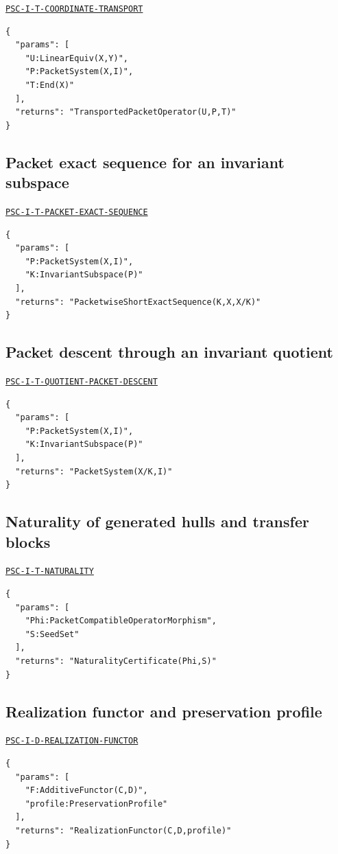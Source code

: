 \documentclass[a4paper,11pt]{article}
\begin{document}
\hyperref[rec:PSC-I-T-COORDINATE-TRANSPORT]{\nolinkurl{PSC-I-T-COORDINATE-TRANSPORT}}
\begin{lstlisting}
{
  "params": [
    "U:LinearEquiv(X,Y)",
    "P:PacketSystem(X,I)",
    "T:End(X)"
  ],
  "returns": "TransportedPacketOperator(U,P,T)"
}
\end{lstlisting}
\subsection*{Packet exact sequence for an invariant subspace}
\hyperref[rec:PSC-I-T-PACKET-EXACT-SEQUENCE]{\nolinkurl{PSC-I-T-PACKET-EXACT-SEQUENCE}}
\begin{lstlisting}
{
  "params": [
    "P:PacketSystem(X,I)",
    "K:InvariantSubspace(P)"
  ],
  "returns": "PacketwiseShortExactSequence(K,X,X/K)"
}
\end{lstlisting}
\subsection*{Packet descent through an invariant quotient}
\hyperref[rec:PSC-I-T-QUOTIENT-PACKET-DESCENT]{\nolinkurl{PSC-I-T-QUOTIENT-PACKET-DESCENT}}
\begin{lstlisting}
{
  "params": [
    "P:PacketSystem(X,I)",
    "K:InvariantSubspace(P)"
  ],
  "returns": "PacketSystem(X/K,I)"
}
\end{lstlisting}
\subsection*{Naturality of generated hulls and transfer blocks}
\hyperref[rec:PSC-I-T-NATURALITY]{\nolinkurl{PSC-I-T-NATURALITY}}
\begin{lstlisting}
{
  "params": [
    "Phi:PacketCompatibleOperatorMorphism",
    "S:SeedSet"
  ],
  "returns": "NaturalityCertificate(Phi,S)"
}
\end{lstlisting}
\subsection*{Realization functor and preservation profile}
\hyperref[rec:PSC-I-D-REALIZATION-FUNCTOR]{\nolinkurl{PSC-I-D-REALIZATION-FUNCTOR}}
\begin{lstlisting}
{
  "params": [
    "F:AdditiveFunctor(C,D)",
    "profile:PreservationProfile"
  ],
  "returns": "RealizationFunctor(C,D,profile)"
}
\end{lstlisting}
\end{document}
